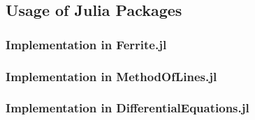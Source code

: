 \subsection{Usage of Julia Packages}

\subsubsection{Implementation in Ferrite.jl}

\subsubsection{Implementation in MethodOfLines.jl}

\subsubsection{Implementation in DifferentialEquations.jl}